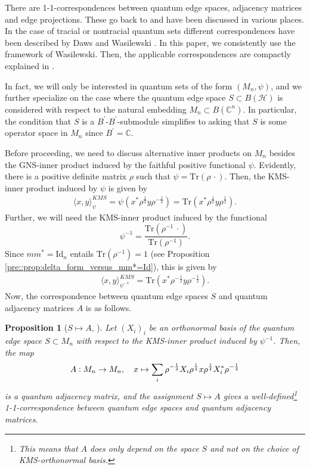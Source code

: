 \documentclass{amsart}
\newtheorem{proposition}[thm]{Proposition}
\newcommand{\cc}{\vcentcolon}
\newcommand{\C}{\mathbb{C}}
\begin{document}
There are 1-1-correspondences between quantum edge spaces, adjacency matrices and edge projections. These go back to \cite{musto_compositional_2018, weaver_quantum_2012} and have been discussed in various places. In the case of tracial or nontracial quantum sets different correspondences have been described by Daws and Wasilewski \cite{daws_quantum_2024,wasilewski_quantum_2024}. In this paper, we consistently use the framework of Wasilewski.
Then, the applicable correspondences are compactly explained in \cite[Section 3.4]{wasilewski_quantum_2024}.

In fact, we will only be interested in quantum sets of the form $(M_n, \psi)$, and we further specialize on the case where the quantum edge space $S \subset B(\mathcal{H})$ is considered with respect to the natural embedding $M_n \subset B(\C^n)$. In particular, the condition that $S$ is a $B^\prime$-$B^\prime$-submodule simplifies to asking that $S$ is some operator space in $M_n$ since $B^\prime = \C$. 

Before proceeding, we need to discuss alternative inner products on $M_n$ besides the GNS-inner product induced by the faithful positive functional $\psi$. Evidently, there is a positive definite matrix $\rho$ such that $\psi = \mathrm{Tr}(\rho\, \cdot)$. Then, the KMS-inner product induced by $\psi$ is given by
\begin{align*}
    \langle x, y \rangle^{KMS}_\psi = \psi\left(x^\ast \rho^{\frac{1}{2}} y \rho^{-\frac{1}{2}}\right) = \mathrm{Tr}(x^\ast \rho^{\frac{1}{2}} y \rho^{\frac{1}{2}}).
\end{align*}
Further, we will need the KMS-inner product induced by the functional 
$$
    \psi^{-1} = \frac{\mathrm{Tr}(\rho^{-1} \, \cdot)}{\mathrm{Tr}(\rho^{-1})} .
$$
Since $m m^\ast = \mathrm{Id}_n$ entails $\mathrm{Tr}(\rho^{-1}) = 1$ (see Proposition \ref{pre::prop:delta_form_versus_mm*=Id}), this is given by
\begin{align*}
    \langle x, y \rangle^{KMS}_{\psi^{-1}} = \mathrm{Tr}(x^\ast \rho^{-\frac{1}{2}} y \rho^{-\frac{1}{2}}).
\end{align*}
Now, the correspondence between quantum edge spaces $S$ and quantum adjacency matrices $A$ is as follows.

\begin{proposition}[{$S\mapsto A$, \cite[Proposition 3.30]{wasilewski_quantum_2024}}]
    \label{pre::prop:S->A}
    Let $(X_i)_i$ be an orthonormal basis of the quantum edge space $S\subset M_n$ with respect to the KMS-inner product induced by $\psi^{-1}$. Then, the map
    \begin{align*} 
        A\cc M_n \to M_n, \quad x \mapsto
        \sum_i\rho^{-\frac{1}{4}}X_i\rho^{\frac{1}{4}}x\rho^{\frac{1}{4}}X_i^*\rho^{-\frac{1}{4}}
    \end{align*}
    is a quantum adjacency matrix, and the assignment $S \mapsto A$ gives a well-defined\footnote{This means that $A$ does only depend on the space $S$ and not on the choice of KMS-orthonormal basis.} 1-1-correspondence between quantum edge spaces and quantum adjacency matrices.
\end{proposition}
\end{document}
